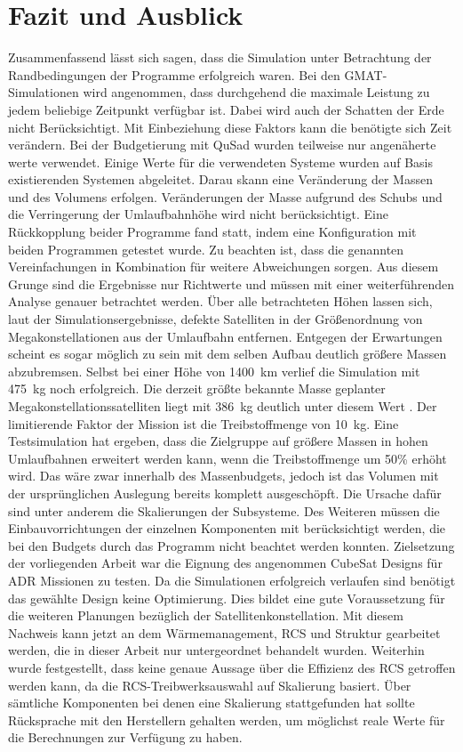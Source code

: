 \chapter{Fazit und Ausblick}
Zusammenfassend lässt sich sagen, dass die Simulation unter Betrachtung der Randbedingungen der Programme erfolgreich waren. Bei den GMAT-Simulationen wird angenommen, dass durchgehend die maximale Leistung zu jedem beliebige Zeitpunkt verfügbar ist. Dabei wird auch der Schatten der Erde nicht Berücksichtigt. Mit Einbeziehung diese Faktors kann die benötigte sich Zeit verändern. Bei der Budgetierung mit QuSad wurden teilweise nur angenäherte werte verwendet. Einige Werte für die verwendeten Systeme wurden auf Basis existierenden Systemen abgeleitet. Darau skann eine Veränderung der Massen und des Volumens erfolgen. Veränderungen der Masse aufgrund des Schubs und die Verringerung der Umlaufbahnhöhe wird nicht berücksichtigt. Eine Rückkopplung beider Programme fand statt, indem eine Konfiguration mit beiden Programmen getestet wurde. Zu beachten ist, dass die genannten Vereinfachungen in Kombination für weitere Abweichungen sorgen. Aus diesem Grunge sind die Ergebnisse nur Richtwerte und müssen mit einer weiterführenden Analyse genauer betrachtet werden. 
 Über alle betrachteten Höhen lassen sich, laut der Simulationsergebnisse, defekte Satelliten in der Größenordnung von Megakonstellationen aus der Umlaufbahn entfernen. Entgegen der Erwartungen scheint es sogar möglich zu sein mit dem selben Aufbau deutlich größere Massen abzubremsen. Selbst bei einer Höhe von \SI{1400}{\kilo\metre} verlief die Simulation mit \SI{475}{\kilogram} noch erfolgreich. Die derzeit größte bekannte Masse geplanter Megakonstellationssatelliten liegt mit \SI{386}{\kilogram} deutlich unter diesem Wert \cite{BenLarbi.2017}. Der limitierende Faktor der Mission ist die Treibstoffmenge von \SI{10}{\kilogram}. Eine Testsimulation hat ergeben, dass die Zielgruppe auf größere Massen in hohen Umlaufbahnen erweitert werden kann, wenn die Treibstoffmenge um \num{50}\% erhöht wird. Das wäre zwar innerhalb des Massenbudgets, jedoch ist das Volumen mit der ursprünglichen Auslegung bereits komplett ausgeschöpft. Die Ursache dafür sind unter anderem die Skalierungen der Subsysteme. Des Weiteren müssen die Einbauvorrichtungen der einzelnen Komponenten mit berücksichtigt werden, die bei den Budgets durch das Programm nicht beachtet werden konnten. Zielsetzung der vorliegenden Arbeit war die Eignung des angenommen CubeSat Designs für ADR Missionen zu testen. Da die  Simulationen erfolgreich verlaufen sind benötigt das gewählte Design keine Optimierung. Dies bildet eine gute Voraussetzung für die weiteren Planungen bezüglich der Satellitenkonstellation. Mit diesem Nachweis kann jetzt an dem Wärmemanagement, RCS und Struktur gearbeitet werden, die in dieser Arbeit nur untergeordnet behandelt wurden. Weiterhin wurde festgestellt, dass keine genaue Aussage über die Effizienz des RCS getroffen werden kann, da die RCS-Treibwerksauswahl auf Skalierung basiert. Über sämtliche Komponenten bei denen eine Skalierung stattgefunden hat sollte Rücksprache mit den Herstellern gehalten werden, um möglichst reale Werte für die Berechnungen zur Verfügung zu haben. 
